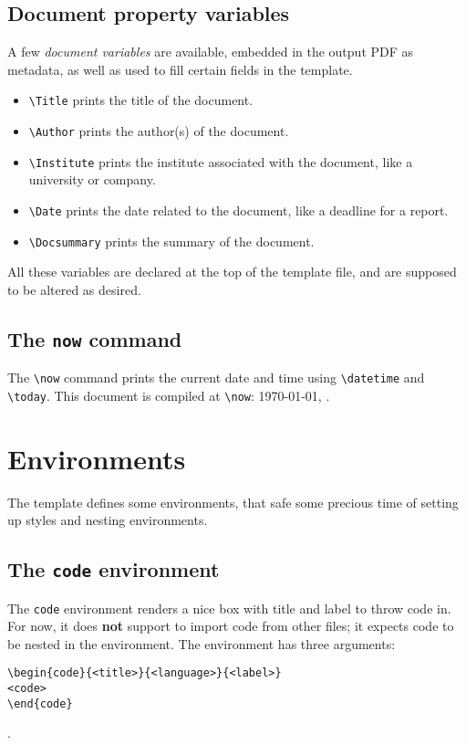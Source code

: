 \documentclass[leqno]{article}			%
\newcommand{\now}{\today, \currenttime} %
\begin{document}
\subsection{Document property variables}
\label{ss:docvars}
A few \textit{document variables} are available, embedded in the output PDF as metadata, as well as used to fill certain fields in the template.
\begin{itemize}
	\item \verb!\Title! prints the title of the document.
	\item \verb!\Author! prints the author(s) of the document.
	\item \verb!\Institute! prints the institute associated with the document, like a university or company.
	\item \verb!\Date! prints the date related to the document, like a deadline for a report.
	\item \verb!\Docsummary! prints the summary of the document.
\end{itemize}

All these variables are declared at the top of the template file, and are supposed to be altered as desired.

\subsection{The \texttt{now} command}
\label{ss:now}
The \verb|\now| command prints the current date and time using \verb|\datetime| and \verb|\today|. This document is compiled at \verb|\now|: \now.

\newpage
\section{Environments}
\label{s:envs}
The template defines some environments, that safe some precious time of setting up styles and nesting environments.

\subsection{The \texttt{code} environment}
\label{ss:code}
The \verb|code| environment renders a nice box with title and label to throw code in. For now, it does \textbf{not} support to import code from other files; it expects code to be nested in the environment. The environment has three arguments:

\begin{verbatim}
\begin{code}{<title>}{<language>}{<label>}
<code>
\end{code}
\end{verbatim}.
\end{document}
